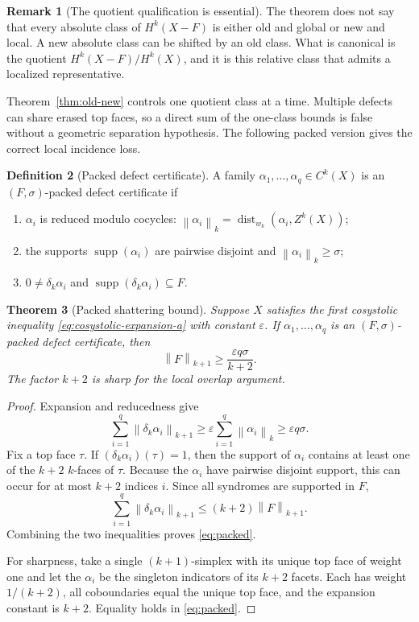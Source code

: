 \documentclass[11pt,letterpaper]{article}
\theoremstyle{plain}
\newtheorem{theorem}{Theorem}[section]
\theoremstyle{definition}
\newtheorem{definition}[theorem]{Definition}
\newtheorem{remark}[theorem]{Remark}
\newcommand{\supp}{\operatorname{supp}}
\newcommand{\dist}{\operatorname{dist}}
\newcommand{\1}{\mathbf{1}}
\newcommand{\norm}[1]{\left\lVert#1\right\rVert}
\begin{document}
\begin{remark}[The quotient qualification is essential]\label{rem:quotient}
The theorem does not say that every absolute class of $H^k(X-F)$ is either old and global
or new and local.  A new absolute class can be shifted by an old class.  What is canonical
is the quotient $H^k(X-F)/H^k(X)$, and it is this relative class that admits a localized
representative.
\end{remark}

Theorem~\ref{thm:old-new} controls one quotient class at a time.  Multiple defects can
share erased top faces, so a direct sum of the one-class bounds is false without a
geometric separation hypothesis.  The following packed version gives the correct local
incidence loss.

\begin{definition}[Packed defect certificate]\label{def:packed}
A family $\alpha_1,\ldots,\alpha_q\in C^k(X)$ is an $(F,\sigma)$-packed defect certificate if
\begin{enumerate}[label=\textup{(\alph*)},leftmargin=2.2em]
\item $\alpha_i$ is reduced modulo cocycles:
$\norm{\alpha_i}_k=\dist_{w_k}(\alpha_i,Z^k(X))$;
\item the supports $\supp(\alpha_i)$ are pairwise disjoint and
$\norm{\alpha_i}_k\ge \sigma$;
\item $0\ne\delta_k\alpha_i$ and $\supp(\delta_k\alpha_i)\subseteq F$.
\end{enumerate}
\end{definition}

\begin{theorem}[Packed shattering bound]\label{thm:packed}
Suppose $X$ satisfies the first cosystolic inequality
\eqref{eq:cosystolic-expansion-a} with constant $\varepsilon$.  If
$\alpha_1,\ldots,\alpha_q$ is an $(F,\sigma)$-packed defect certificate, then
\begin{equation}\label{eq:packed}
 \norm F_{k+1}\ge \frac{\varepsilon q \sigma}{k+2}.
\end{equation}
The factor $k+2$ is sharp for the local overlap argument.
\end{theorem}

\begin{proof}
Expansion and reducedness give
\[
 \sum_{i=1}^q\norm{\delta_k\alpha_i}_{k+1}
 \ge\varepsilon\sum_{i=1}^q\norm{\alpha_i}_k
 \ge\varepsilon q \sigma.
\]
Fix a top face $\tau$.  If $(\delta_k\alpha_i)(\tau)=1$, then the support of
$\alpha_i$ contains at least one of the $k+2$ $k$-faces of $\tau$.  Because the
$\alpha_i$ have pairwise disjoint support, this can occur for at most $k+2$ indices
$i$.  Since all syndromes are supported in $F$,
\[
 \sum_{i=1}^q\norm{\delta_k\alpha_i}_{k+1}
 \le (k+2)\norm F_{k+1}.
\]
Combining the two inequalities proves \eqref{eq:packed}.

For sharpness, take a single $(k+1)$-simplex with its unique top face of weight one and
let the $\alpha_i$ be the singleton indicators of its $k+2$ facets.  Each has weight
$1/(k+2)$, all coboundaries equal the unique top face, and the expansion constant is
$k+2$.  Equality holds in \eqref{eq:packed}.
\end{proof}
\end{document}
